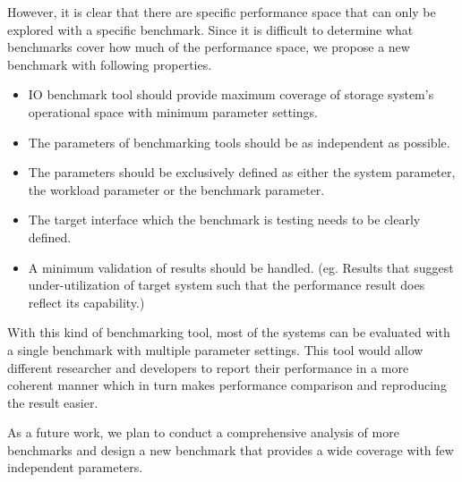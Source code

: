 However, it is clear that there are specific performance space that can only be explored with a specific benchmark. Since it is difficult to determine what benchmarks cover how much of the performance space, we propose a new benchmark with following properties.
\begin{itemize}
\item IO benchmark tool should provide maximum coverage of storage system's operational space with minimum parameter settings.  
\item The parameters of benchmarking tools should be as independent as possible.
\item The parameters should be exclusively defined as either the system parameter, the workload parameter or the benchmark parameter. 
\item The target interface which the benchmark is testing needs to be clearly defined. 
\item A minimum validation of results should be handled. (eg. Results that suggest under-utilization of target system such that the performance result does reflect its capability.)
\end{itemize}

With this kind of benchmarking tool, most of the systems can be evaluated with a single benchmark with multiple parameter settings. This tool would allow different researcher and developers to report their performance in a more coherent manner which in turn makes performance comparison and reproducing the result easier. 

As a future work, we plan to conduct a comprehensive analysis of more benchmarks and design a new benchmark that provides a wide coverage with few independent parameters. 

